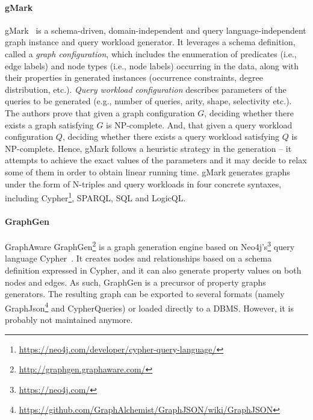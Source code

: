\paragraph{gMark}  gMark~\cite{gMark} is a schema-driven, domain-independent and query language-independent graph instance and query workload generator.  It leverages a schema definition,
called a \emph{graph configuration}, which includes the enumeration of predicates (i.e., edge labels) and node types (i.e., node labels) occurring in the data, along with their properties in generated instances (occurrence constraints, degree distribution, etc.). \emph{Query workload configuration}  describes parameters of the queries to be generated (e.g., number of queries, arity, shape, selectivity etc.). The authors prove that given a graph configuration $G$, deciding whether there exists a graph satisfying $G$ is NP-complete. And, that given a query workload configuration $Q$, deciding
whether there exists a query workload satisfying $Q$ is NP-complete. Hence, gMark follows a heuristic strategy in the generation -- it attempts to achieve the exact values of the parameters and it may decide to relax some of them in order to obtain linear running time. gMark generates graphs under the form of N-triples and query workloads in four concrete syntaxes, including Cypher\footnote{\url{https://neo4j.com/developer/cypher-query-language/}}, SPARQL, SQL and LogicQL.

\paragraph{GraphGen}  GraphAware GraphGen\footnote{\url{http://graphgen.graphaware.com/}} is a graph generation engine based on Neo4j's\footnote{\url{https://neo4j.com/}} query language Cypher~\cite{GraphGen}.  It creates nodes and relationships based on a schema definition expressed in Cypher, and it can also generate property values on both
nodes and edges. As such, GraphGen is a precursor of property graphs generators. The resulting graph can be exported to several formats (namely GraphJson\footnote{\url{https://github.com/GraphAlchemist/GraphJSON/wiki/GraphJSON}} and CypherQueries) or loaded directly to a DBMS. However, it is probably not maintained anymore. 